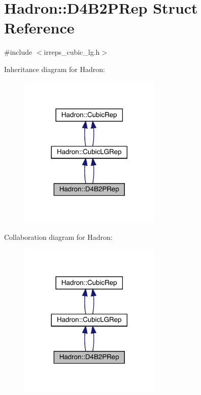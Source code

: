 \hypertarget{structHadron_1_1D4B2PRep}{}\section{Hadron\+:\+:D4\+B2\+P\+Rep Struct Reference}
\label{structHadron_1_1D4B2PRep}


{\ttfamily \#include $<$irreps\+\_\+cubic\+\_\+lg.\+h$>$}



Inheritance diagram for Hadron\+:\nopagebreak
\begin{figure}[H]
\begin{center}
\leavevmode
\includegraphics[width=192pt]{d4/d23/structHadron_1_1D4B2PRep__inherit__graph}
\end{center}
\end{figure}


Collaboration diagram for Hadron\+:\nopagebreak
\begin{figure}[H]
\begin{center}
\leavevmode
\includegraphics[width=192pt]{d0/d2d/structHadron_1_1D4B2PRep__coll__graph}
\end{center}
\end{figure}

